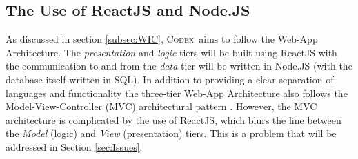 \documentclass[progress]{cmpreport}
\newcommand{\Codex}{\textsc{Codex}}
\begin{document}
		\subsection{The Use of ReactJS and Node.JS}
		As discussed in section \ref{subsec:WIC}, \Codex \ aims to follow the Web-App Architecture. The \emph{presentation} and \emph{logic} tiers will be built using ReactJS with the communication to and from the \emph{data} tier will be written in Node.JS (with the database itself written in SQL). In addition to providing a clear separation of languages and functionality the three-tier Web-App Architecture also follows the Model-View-Controller (MVC) architectural pattern \citep{ModelViewController}. However, the MVC architecture is complicated by the use of ReactJS, which blurs the line between the \emph{Model} (logic) and \emph{View} (presentation) tiers. This is a problem that will be addressed in Section \ref{sec:Issues}.
		
\end{document}
